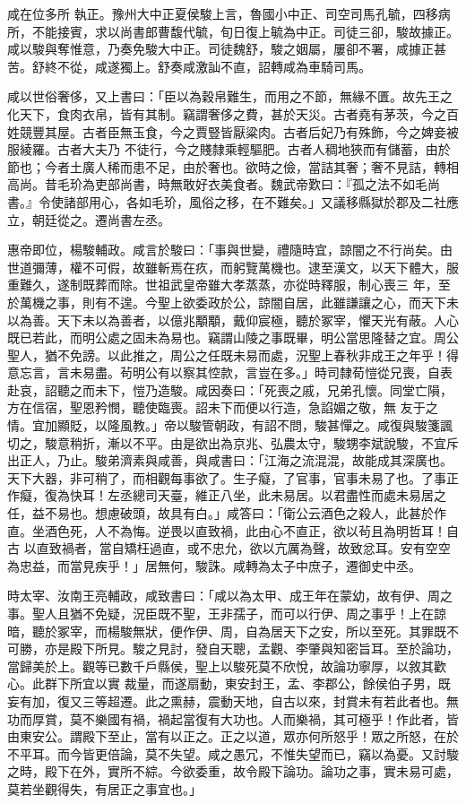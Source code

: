 \begin{pinyinscope}
 咸在位多所
 執正。豫州大中正夏侯駿上言，魯國小中正、司空司馬孔毓，四移病所，不能接賓，求以尚書郎曹馥代毓，旬日復上毓為中正。司徒三卻，駿故據正。咸以駿與奪惟意，乃奏免駿大中正。司徒魏舒，駿之姻屬，屢卻不署，咸據正甚苦。舒終不從，咸遂獨上。舒奏咸激訕不直，詔轉咸為車騎司馬。



 咸以世俗奢侈，又上書曰：「臣以為穀帛難生，而用之不節，無緣不匱。故先王之化天下，食肉衣帛，皆有其制。竊謂奢侈之費，甚於天災。古者堯有茅茨，今之百姓競豐其屋。古者臣無玉食，今之賈豎皆厭粱肉。古者后妃乃有殊飾，今之婢妾被服綾羅。古者大夫乃
 不徒行，今之賤隸乘輕驅肥。古者人稠地狹而有儲蓄，由於節也；今者土廣人稀而患不足，由於奢也。欲時之儉，當詰其奢；奢不見詰，轉相高尚。昔毛玠為吏部尚書，時無敢好衣美食者。魏武帝歎曰：『孤之法不如毛尚書。』令使諸部用心，各如毛玠，風俗之移，在不難矣。」又議移縣獄於郡及二社應立，朝廷從之。遷尚書左丞。



 惠帝即位，楊駿輔政。咸言於駿曰：「事與世變，禮隨時宜，諒闇之不行尚矣。由世道彌薄，權不可假，故雖斬焉在疚，而躬覽萬機也。逮至漢文，以天下體大，服重難久，遂制既葬而除。世祖武皇帝雖大孝蒸蒸，亦從時釋服，制心喪三
 年，至於萬機之事，則有不遑。今聖上欲委政於公，諒闇自居，此雖謙讓之心，而天下未以為善。天下未以為善者，以億兆顒顒，戴仰宸極，聽於冢宰，懼天光有蔽。人心既已若此，而明公處之固未為易也。竊謂山陵之事既畢，明公當思隆替之宜。周公聖人，猶不免謗。以此推之，周公之任既未易而處，況聖上春秋非成王之年乎！得意忘言，言未易盡。茍明公有以察其悾款，言豈在多。」時司隸荀愷從兄喪，自表赴哀，詔聽之而未下，愷乃造駿。咸因奏曰：「死喪之戚，兄弟孔懷。同堂亡隕，方在信宿，聖恩矜憫，聽使臨喪。詔未下而便以行造，急諂媚之敬，無
 友于之情。宜加顯貶，以隆風教。」帝以駿管朝政，有詔不問，駿甚憚之。咸復與駿箋諷切之，駿意稍折，漸以不平。由是欲出為京兆、弘農太守，駿甥李斌說駿，不宜斥出正人，乃止。駿弟濟素與咸善，與咸書曰：「江海之流混混，故能成其深廣也。天下大器，非可稍了，而相觀每事欲了。生子癡，了官事，官事未易了也。了事正作癡，復為快耳！左丞總司天臺，維正八坐，此未易居。以君盡性而處未易居之任，益不易也。想慮破頭，故具有白。」咸答曰：「衛公云酒色之殺人，此甚於作直。坐酒色死，人不為悔。逆畏以直致禍，此由心不直正，欲以茍且為明哲耳！自古
 以直致禍者，當自矯枉過直，或不忠允，欲以亢厲為聲，故致忿耳。安有空空為忠益，而當見疾乎！」居無何，駿誅。咸轉為太子中庶子，遷御史中丞。



 時太宰、汝南王亮輔政，咸致書曰：「咸以為太甲、成王年在蒙幼，故有伊、周之事。聖人且猶不免疑，況臣既不聖，王非孺子，而可以行伊、周之事乎！上在諒暗，聽於冢宰，而楊駿無狀，便作伊、周，自為居天下之安，所以至死。其罪既不可勝，亦是殿下所見。駿之見討，發自天聰，孟觀、李肇與知密旨耳。至於論功，當歸美於上。觀等已數千戶縣侯，聖上以駿死莫不欣悅，故論功寧厚，以敘其歡心。此群下所宜以實
 裁量，而遂扇動，東安封王，孟、李郡公，餘侯伯子男，既妄有加，復又三等超遷。此之熏赫，震動天地，自古以來，封賞未有若此者也。無功而厚賞，莫不樂國有禍，禍起當復有大功也。人而樂禍，其可極乎！作此者，皆由東安公。謂殿下至止，當有以正之。正之以道，眾亦何所怒乎！眾之所怒，在於不平耳。而今皆更倍論，莫不失望。咸之愚冗，不惟失望而已，竊以為憂。又討駿之時，殿下在外，實所不綜。今欲委重，故令殿下論功。論功之事，實未易可處，莫若坐觀得失，有居正之事宜也。」




\end{pinyinscope}
